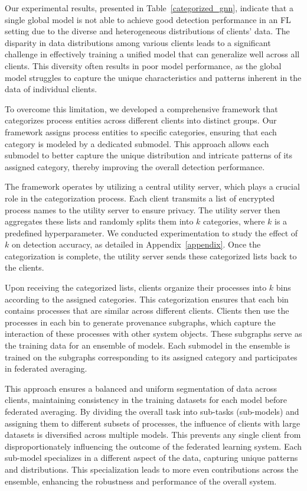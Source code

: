 Our experimental results, presented in Table~\ref{categorized_gnn}, indicate that a single global \gnnshort model is not able to achieve good detection performance in an FL setting due to the diverse and heterogeneous distributions of clients' data. The disparity in data distributions among various clients leads to a significant challenge in effectively training a unified model that can generalize well across all clients. This diversity often results in poor model performance, as the global model struggles to capture the unique characteristics and patterns inherent in the data of individual clients.

To overcome this limitation, we developed a comprehensive framework that categorizes process entities across different clients into distinct groups. Our framework assigns process entities to specific categories, ensuring that each category is modeled by a dedicated submodel. This approach allows each submodel to better capture the unique distribution and intricate patterns of its assigned category, thereby improving the overall detection performance.

The framework operates by utilizing a central utility server, which plays a crucial role in the categorization process. Each client transmits a list of encrypted process names to the utility server to ensure privacy. The utility server then aggregates these lists and randomly splits them into \(k\) categories, where \(k\) is a predefined hyperparameter. We conducted experimentation to study the effect of \(k\) on detection accuracy, as detailed in Appendix~\ref{appendix}. Once the categorization is complete, the utility server sends these categorized lists back to the clients.

Upon receiving the categorized lists, clients organize their processes into \(k\) bins according to the assigned categories. This categorization ensures that each bin contains processes that are similar across different clients. Clients then use the processes in each bin to generate provenance subgraphs, which capture the interaction of these processes with other system objects. These subgraphs serve as the training data for an ensemble of \gnnshort models. Each submodel in the ensemble is trained on the subgraphs corresponding to its assigned category and participates in federated averaging.

This approach ensures a balanced and uniform segmentation of data across clients, maintaining consistency in the training datasets for each \gnnshort model before federated averaging. By dividing the overall task into sub-tasks (sub-models) and assigning them to different subsets of processes, the influence of clients with large datasets is diversified across multiple models. This prevents any single client from disproportionately influencing the outcome of the federated learning system. Each sub-model specializes in a different aspect of the data, capturing unique patterns and distributions. This specialization leads to more even contributions across the ensemble, enhancing the robustness and performance of the overall system.


